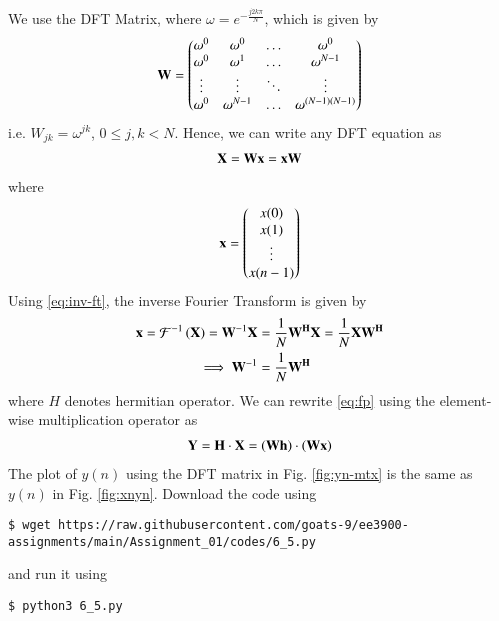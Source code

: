 \documentclass[journal,12pt,twocolumn]{IEEEtran}
\renewcommand\thesection{\arabic{section}}
\begin{document}
\begin{enumerate}[label=\thesection.\arabic*]
\solution
We use the DFT Matrix, where $\omega = e^{-\frac{j2k\pi}{N}}$, which is given by
\begin{align}
	\mathbf{W} = 
	\begin{pmatrix}
		\omega^0 & \omega^0 & \ldots & \omega^0 \\
		\omega^0 & \omega^1 & \ldots & \omega^{N - 1} \\
		\vdots & \vdots & \ddots & \vdots \\
		\omega^0 & \omega^{N - 1} & \ldots & \omega^{(N -1)(N - 1)}
	\end{pmatrix}
\end{align}
i.e. $W_{jk} = \omega^{jk}$, $0 \leq j, k < N$. Hence, we can write any DFT equation as
\begin{align}
	\mathbf{X} = \mathbf{W}\mathbf{x} = \mathbf{x}\mathbf{W}
\end{align}
\noindent where
\begin{align}
	\mathbf{x} = 
	\begin{pmatrix}
		x(0) \\ x(1) \\ \vdots \\ x(n - 1)
	\end{pmatrix}
\end{align}
\noindent Using \eqref{eq:inv-ft}, the inverse Fourier Transform is given by
\begin{align}
	\mathbf{x} = \mathcal{F}^{-1}\left(\mathbf{X}\right) = \mathbf{W}^{-1}\mathbf{X} &= 
	\frac{1}{N}\mathbf{W^{H}}\mathbf{X} = \frac{1}{N}\mathbf{X}\mathbf{W^{H}} \\ 
	\implies \mathbf{W}^{-1} &= \frac{1}{N}\mathbf{W^{H}}
\end{align}
\noindent where $H$ denotes hermitian operator. We can rewrite \eqref{eq:fp} using the
element-wise multiplication operator as
\begin{align}
	\mathbf{Y} = \mathbf{H}\cdot\mathbf{X} = \left(\mathbf{W}\mathbf{h}\right)\cdot\left(\mathbf{W}\mathbf{x}\right)
\end{align}
The plot of $y(n)$ using the DFT matrix in Fig. \eqref{fig:yn-mtx} is the same as $y(n)$ in 
Fig. \eqref{fig:xnyn}. Download the code using
\begin{lstlisting}
$ wget https://raw.githubusercontent.com/goats-9/ee3900-assignments/main/Assignment_01/codes/6_5.py
\end{lstlisting}
and run it using
\begin{lstlisting}
$ python3 6_5.py 
\end{lstlisting}
\end{enumerate}
\end{document}
